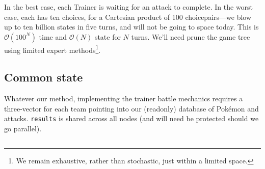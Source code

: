 In the best case, each Trainer is waiting for an attack to complete.
In the worst case, each has ten choices, for a Cartesian product of 100 choicepairs---we
  blow up to ten billion states in five turns, and will not be going to space today.
This is $\mathcal{O}(100^N)$ time and $\mathcal{O}(N)$ state for $N$ turns.
We'll need prune the game tree using limited expert methods\footnote{We remain exhaustive, rather than
 stochastic, just within a limited space.}.

\subsection{Common state\label{subsec:commonstate}}
Whatever our method, implementing the trainer battle mechanics requires a
  three-vector for each team pointing into our (readonly) database of Pokémon and attacks.
\texttt{results} is shared across all nodes (and will need be protected should we go parallel).
\inputminted{cpp}{s/simul.h}

